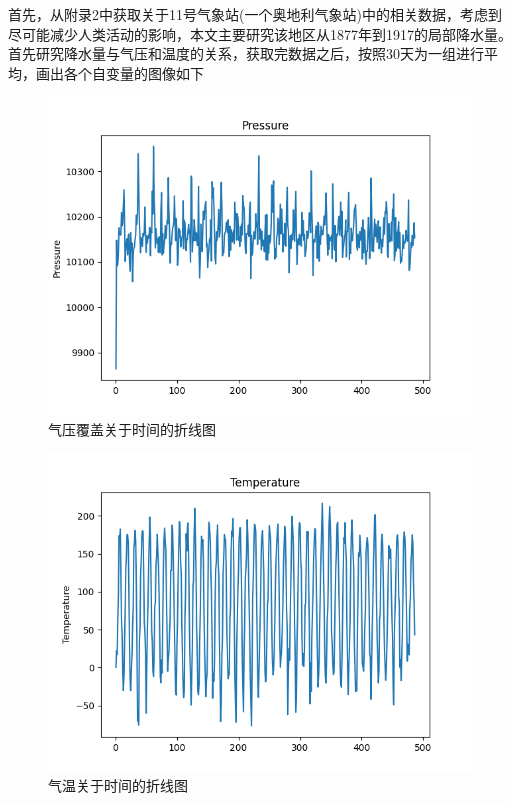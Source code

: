 \documentclass[UTF8]{ctexart}
\begin{document}
  首先，从附录2中获取关于11号气象站(一个奥地利气象站)中的相关数据，考虑到尽可能减少人类活动的影响，本文主要研究该地区从1877年到1917的局部降水量。首先研究降水量与气压和温度的关系，获取完数据之后，按照$30$天为一组进行平均，画出各个自变量的图像如下
    \begin{figure}[htbp]
  	\centering
  	\includegraphics[scale=0.5]{pp.png}
  	\caption{气压覆盖关于时间的折线图}
  \end{figure}
  
      \begin{figure}[htbp]
  	\centering
  	\includegraphics[scale=0.5]{tg.png}
  	\caption{气温关于时间的折线图}
  \end{figure}
  
\end{document}
